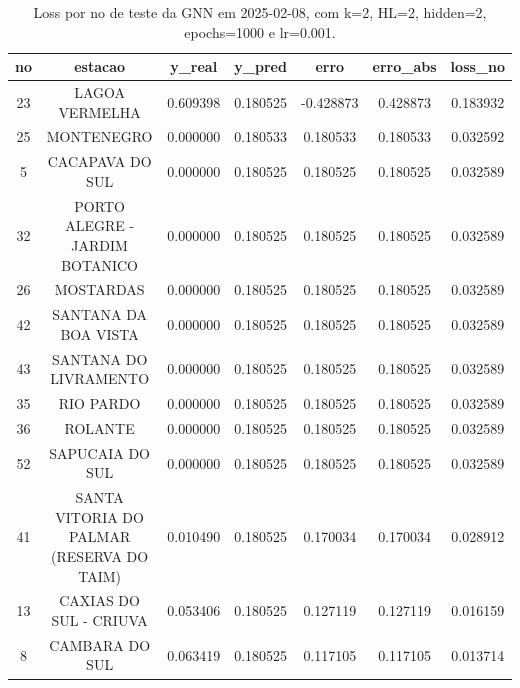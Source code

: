 \begin{table}[h]
\centering
\caption{Loss por no de teste da GNN em 2025-02-08, com k=2, HL=2, hidden=2, epochs=1000 e lr=0.001.}
\label{tab:gnn_loss_k2_hl2_h2_e1000_d20250208}
\begin{tabular}{ccccccc}
\toprule
no & estacao & y\_real & y\_pred & erro & erro\_abs & loss\_no \\
\midrule
23 & LAGOA VERMELHA & 0.609398 & 0.180525 & -0.428873 & 0.428873 & 0.183932 \\
25 & MONTENEGRO & 0.000000 & 0.180533 & 0.180533 & 0.180533 & 0.032592 \\
5 & CACAPAVA DO SUL & 0.000000 & 0.180525 & 0.180525 & 0.180525 & 0.032589 \\
32 & PORTO ALEGRE - JARDIM BOTANICO & 0.000000 & 0.180525 & 0.180525 & 0.180525 & 0.032589 \\
26 & MOSTARDAS & 0.000000 & 0.180525 & 0.180525 & 0.180525 & 0.032589 \\
42 & SANTANA DA BOA VISTA & 0.000000 & 0.180525 & 0.180525 & 0.180525 & 0.032589 \\
43 & SANTANA DO LIVRAMENTO & 0.000000 & 0.180525 & 0.180525 & 0.180525 & 0.032589 \\
35 & RIO PARDO & 0.000000 & 0.180525 & 0.180525 & 0.180525 & 0.032589 \\
36 & ROLANTE & 0.000000 & 0.180525 & 0.180525 & 0.180525 & 0.032589 \\
52 & SAPUCAIA DO SUL & 0.000000 & 0.180525 & 0.180525 & 0.180525 & 0.032589 \\
41 & SANTA VITORIA DO PALMAR (RESERVA DO TAIM) & 0.010490 & 0.180525 & 0.170034 & 0.170034 & 0.028912 \\
13 & CAXIAS DO SUL - CRIUVA & 0.053406 & 0.180525 & 0.127119 & 0.127119 & 0.016159 \\
8 & CAMBARA DO SUL & 0.063419 & 0.180525 & 0.117105 & 0.117105 & 0.013714 \\
\bottomrule
\end{tabular}
\end{table}
